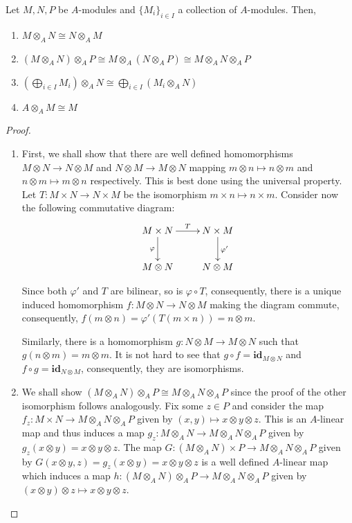 \begin{proposition}
    Let $M, N, P$ be $A$-modules and $\{M_i\}_{i\in I}$ a collection of $A$-modules. Then, 
    \begin{enumerate}[label=(\alph*)]
    \item $M\otimes_A N\cong N\otimes_A M$ 
    \item $(M\otimes_A N)\otimes_A P\cong M\otimes_A(N\otimes_A P)\cong M\otimes_A N\otimes_A P$ 
    \item $\left(\bigoplus_{i\in I}M_i\right)\otimes_A N\cong\bigoplus_{i\in I}(M_i\otimes_A N)$
    \item $A\otimes_A M\cong M$
    \end{enumerate}
\end{proposition}
\begin{proof}
\begin{enumerate}[label=(\alph*)]
\item First, we shall show that there are well defined homomorphisms $M\otimes N\to N\otimes M$ and $N\otimes M\to M\otimes N$ mapping $m\otimes n\mapsto n\otimes m$ and $n\otimes m\mapsto m\otimes n$ respectively. This is best done using the universal property. Let $T: M\times N\to N\times M$ be the isomorphism $m\times n\mapsto n\times m$. Consider now the following commutative diagram: 
\begin{equation*}
\xymatrix{
    M\times N\ar[d]_\varphi\ar[r]^-T & N\times M\ar[d]^{\varphi'}\\
    M\otimes N & N\otimes M
}
\end{equation*}

Since both $\varphi'$ and $T$ are bilinear, so is $\varphi\circ T$, consequently, there is a unique induced homomorphism $f: M\otimes N\to N\otimes M$ making the diagram commute, consequently, $f(m\otimes n) = \varphi'(T(m\times n)) = n\otimes m$.

Similarly, there is a homomorphism $g: N\otimes M\to M\otimes N$ such that $g(n\otimes m) = m\otimes m$. It is not hard to see that $g\circ f = \mathbf{id}_{M\otimes N}$ and $f\circ g = \mathbf{id}_{N\otimes M}$, consequently, they are isomorphisms.

\item We shall show $(M\otimes_A N)\otimes_A P\cong M\otimes_A N\otimes_A P$ since the proof of the other isomorphism follows analogously. Fix some $z\in P$ and consider the map $f_z: M\times N\to M\otimes_A N\otimes_A P$ given by $(x,y)\mapsto x\otimes y\otimes z$. This is an $A$-linear map and thus induces a map $g_z: M\otimes_A N\to M\otimes_A N\otimes_A P$ given by $g_z(x\otimes y) = x\otimes y\otimes z$. The map $G: (M\otimes_A N)\times P\to M\otimes_A N\otimes_A P$ given by $G(x\otimes y, z) = g_z(x\otimes y) = x\otimes y\otimes z$ is a well defined $A$-linear map which induces a map $h: (M\otimes_A N)\otimes_A P\to M\otimes_A N\otimes_A P$ given by $(x\otimes y)\otimes z\mapsto x\otimes y\otimes z$.


\end{enumerate}
\end{proof}
